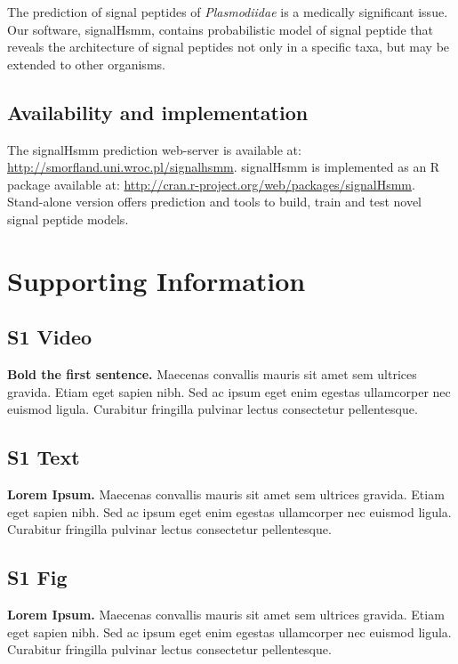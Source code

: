 \documentclass[10pt,letterpaper]{article}
\begin{document}
The prediction of signal peptides of \textit{Plasmodiidae} is a medically significant issue. Our software, signalHsmm, contains probabilistic model of signal peptide that reveals the architecture of signal peptides not only in a specific taxa, but may be extended to other organisms.

\subsection*{Availability and implementation}
The signalHsmm prediction web-server is available at: \url{http://smorfland.uni.wroc.pl/signalhsmm}. signalHsmm is implemented as an R package available at: \url{http://cran.r-project.org/web/packages/signalHsmm}. Stand-alone version offers prediction and tools to build, train and test novel signal peptide models.

\section*{Supporting Information}

\subsection*{S1 Video}
\label{S1_Video}
{\bf Bold the first sentence.}  Maecenas convallis mauris sit amet sem ultrices gravida. Etiam eget sapien nibh. Sed ac ipsum eget enim egestas ullamcorper nec euismod ligula. Curabitur fringilla pulvinar lectus consectetur pellentesque.

\subsection*{S1 Text}
\label{S1_Text}
{\bf Lorem Ipsum.} Maecenas convallis mauris sit amet sem ultrices gravida. Etiam eget sapien nibh. Sed ac ipsum eget enim egestas ullamcorper nec euismod ligula. Curabitur fringilla pulvinar lectus consectetur pellentesque.

\subsection*{S1 Fig}
\label{S1_Fig}
{\bf Lorem Ipsum.} Maecenas convallis mauris sit amet sem ultrices gravida. Etiam eget sapien nibh. Sed ac ipsum eget enim egestas ullamcorper nec euismod ligula. Curabitur fringilla pulvinar lectus consectetur pellentesque.
\end{document}
